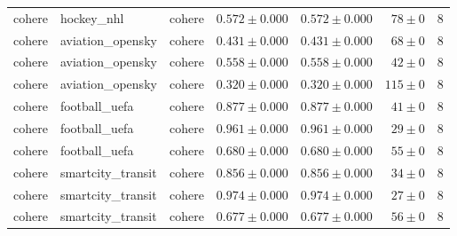 \begin{table}[htbp]
\begin{tabular}{l l l r r r r}
cohere & hockey\_nhl & cohere & $0.572\pm0.000$ & $0.572\pm0.000$ & $78\pm0$ & 8 \\
cohere & aviation\_opensky & cohere & $0.431\pm0.000$ & $0.431\pm0.000$ & $68\pm0$ & 8 \\
cohere & aviation\_opensky & cohere & $0.558\pm0.000$ & $0.558\pm0.000$ & $42\pm0$ & 8 \\
cohere & aviation\_opensky & cohere & $0.320\pm0.000$ & $0.320\pm0.000$ & $115\pm0$ & 8 \\
cohere & football\_uefa & cohere & $0.877\pm0.000$ & $0.877\pm0.000$ & $41\pm0$ & 8 \\
cohere & football\_uefa & cohere & $0.961\pm0.000$ & $0.961\pm0.000$ & $29\pm0$ & 8 \\
cohere & football\_uefa & cohere & $0.680\pm0.000$ & $0.680\pm0.000$ & $55\pm0$ & 8 \\
cohere & smartcity\_transit & cohere & $0.856\pm0.000$ & $0.856\pm0.000$ & $34\pm0$ & 8 \\
cohere & smartcity\_transit & cohere & $0.974\pm0.000$ & $0.974\pm0.000$ & $27\pm0$ & 8 \\
cohere & smartcity\_transit & cohere & $0.677\pm0.000$ & $0.677\pm0.000$ & $56\pm0$ & 8 \\
\hline
\end{tabular}
\end{table}
